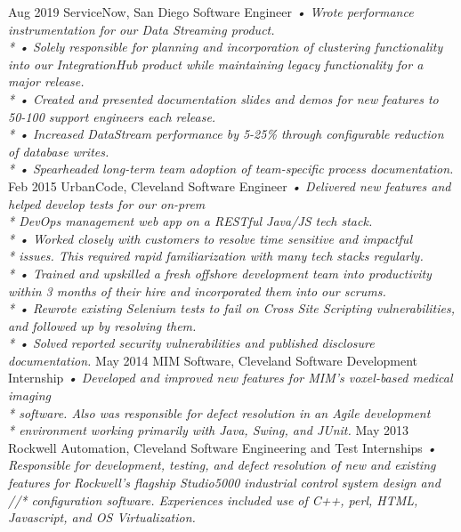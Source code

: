 \documentclass[]{friggeri-cv}
\begin{document}
\begin{entrylist}
  \entry
    {Aug 2019}
    {ServiceNow, San Diego}
    {Software Engineer}
    {\emph{
    •	Wrote performance instrumentation for our Data Streaming product.\\*
    •	Solely responsible for planning and incorporation of clustering functionality into our IntegrationHub product while maintaining legacy functionality for a major release.\\*
    •	Created and presented documentation slides and demos for new features to 50-100 support engineers each release.\\*
    •	Increased DataStream performance by 5-25\% through configurable reduction of database writes.\\*
    •	Spearheaded long-term team adoption of team-specific process documentation.}}
  \entry
    {Feb 2015}
    {UrbanCode, Cleveland}
    {Software Engineer}
    {\emph{
    •	Delivered new features and helped develop tests for our on-prem \\* DevOps management web app on a RESTful Java/JS tech stack.\\*
    •	Worked closely with customers to resolve time sensitive and impactful\\* issues. This required rapid familiarization with many tech stacks regularly.\\*
    •	Trained and upskilled a fresh offshore development team into productivity within 3 months of their hire and incorporated them into our scrums. \\*
    •	Rewrote existing Selenium tests to fail on Cross Site Scripting vulnerabilities, and followed up by resolving them.\\*
    •	Solved reported security vulnerabilities and published disclosure documentation.}}
  \entry
    {May 2014}
    {MIM Software, Cleveland}
    {Software Development Internship}
    {\emph{
    •	Developed and improved new features for MIM's voxel-based medical imaging\\*
    software. Also was responsible for defect resolution in an Agile development \\*
    environment working primarily with Java, Swing, and JUnit.}}
  \entry
    {May 2013}
    {Rockwell Automation, Cleveland}
    {Software Engineering and Test Internships}
    {\emph{
    •	Responsible for development, testing, and defect resolution of new and existing features for Rockwell’s flagship Studio5000 industrial control system design and //*
    configuration software.  Experiences included use of C++, perl, HTML, Javascript, and OS Virtualization.}}
\end{entrylist}
\end{document}

